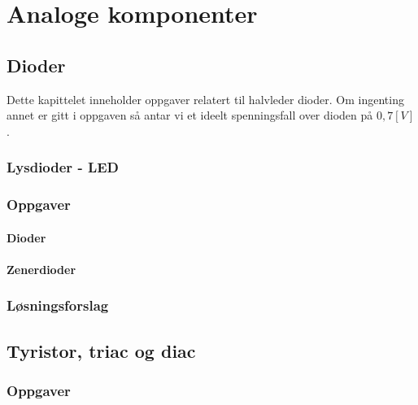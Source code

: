 \documentclass[12pt]{report}
\begin{document}


\tableofcontents

%

\chapter{Analoge komponenter}

\section{Dioder}


Dette kapittelet inneholder oppgaver relatert til halvleder dioder. Om ingenting annet er gitt i oppgaven så antar vi et ideelt spenningsfall over dioden på $0,7[V]$.\\
\subsection{Lysdioder - LED}


\subsection{Oppgaver}
\label{sec:diodeOppgave}
\subsubsection{Dioder}

\subsubsection{Zenerdioder}

\subsection{Løsningsforslag}
\label{sec:diodeLøsning}
\printsolutions[section]

\newpage

\section{Tyristor, triac og diac}
%

\subsection{Oppgaver}

\end{document}

